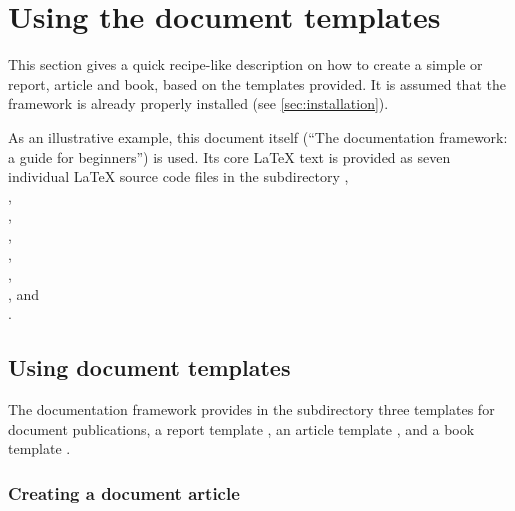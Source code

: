 

\section[Document templates]{Using the document templates}
\label{sec:usingDocumentTemplates}


This section gives a quick recipe-like description on how to create a
simple \singledoc or \multidoc report, article and book, based on the
templates provided.  It is assumed that the \wegcLaTeX{} framework is
already properly installed (see \autoref{sec:installation}).

As an illustrative example, this document itself (``The \wegcLaTeX{}
documentation framework: a guide for beginners'') is used. Its core
\LaTeX{} text is provided as seven individual \LaTeX{} source code files in
the subdirectory
, \IE{} \\
, \\
, \\
, \\
, \\
, \\
, and \\
.

\medskip



\subsection[The \singledoc document templates]{Using \singledoc document templates}
\label{subsec:usingSingleDocumentTemplates}

The \wegcLaTeX{} documentation framework provides in the subdirectory
 three templates for
\singledoc document publications, \IE{} a report template
, an article template
, and a book template .



\subsubsection[A \singledoc document article]{Creating a \singledoc document article}
\label{subsubsec:creatingSingleDocumentArticle}



